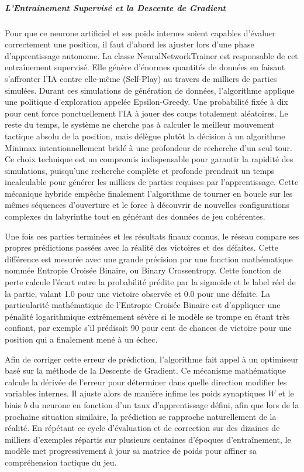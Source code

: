 \documentclass[a4paper]{article}
\begin{document}
\subparagraph{L'Entraînement Supervisé et la Descente de Gradient}

Pour que ce neurone artificiel et ses poids internes soient capables d'évaluer correctement une position, il faut d'abord les ajuster lors d'une phase d'apprentissage autonome. La classe NeuralNetworkTrainer est responsable de cet entraînement supervisé. Elle génère d'énormes quantités de données en faisant s'affronter l'IA contre elle-même (Self-Play) au travers de milliers de parties simulées. Durant ces simulations de génération de données, l'algorithme applique une politique d'exploration appelée Epsilon-Greedy. Une probabilité fixée à dix pour cent force ponctuellement l'IA à jouer des coups totalement aléatoires. Le reste du temps, le système ne cherche pas à calculer le meilleur mouvement tactique absolu de la position, mais délègue plutôt la décision à un algorithme Minimax intentionnellement bridé à une profondeur de recherche d'un seul tour. Ce choix technique est un compromis indispensable pour garantir la rapidité des simulations, puisqu'une recherche complète et profonde prendrait un temps incalculable pour générer les milliers de parties requises par l'apprentissage. Cette mécanique hybride empêche finalement l'algorithme de tourner en boucle sur les mêmes séquences d'ouverture et le force à découvrir de nouvelles configurations complexes du labyrinthe tout en générant des données de jeu cohérentes.

Une fois ces parties terminées et les résultats finaux connus, le réseau compare ses propres prédictions passées avec la réalité des victoires et des défaites. Cette différence est mesurée avec une grande précision par une fonction mathématique nommée Entropie Croisée Binaire, ou Binary Crossentropy. Cette fonction de perte calcule l'écart entre la probabilité prédite par la sigmoïde et le label réel de la partie, valant 1.0 pour une victoire observée et 0.0 pour une défaite. La particularité mathématique de l'Entropie Croisée Binaire est d'appliquer une pénalité logarithmique extrêmement sévère si le modèle se trompe en étant très confiant, par exemple s'il prédisait 90 pour cent de chances de victoire pour une position qui a finalement mené à un échec.

Afin de corriger cette erreur de prédiction, l'algorithme fait appel à un optimiseur basé sur la méthode de la Descente de Gradient. Ce mécanisme mathématique calcule la dérivée de l'erreur pour déterminer dans quelle direction modifier les variables internes. Il ajuste alors de manière infime les poids synaptiques $W$ et le biais $b$ du neurone en fonction d'un taux d'apprentissage défini, afin que lors de la prochaine situation similaire, la prédiction se rapproche naturellement de la réalité. En répétant ce cycle d'évaluation et de correction sur des dizaines de milliers d'exemples répartis sur plusieurs centaines d'époques d'entraînement, le modèle met progressivement à jour sa matrice de poids pour affiner sa compréhension tactique du jeu.
\end{document}
